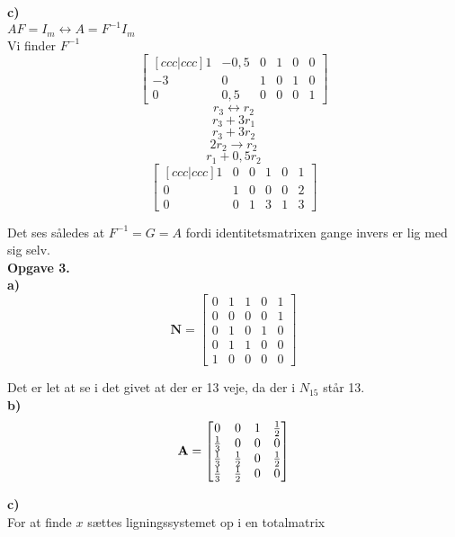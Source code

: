 \documentclass[12pt]{article}
\begin{document}
{\textbf{c)}\\

$AF = I_m \leftrightarrow A = F^{-1} I_m$\\

Vi finder $F^{-1}$\\
$$
\begin{bmatrix}[ccc|ccc]
1  & -0,5 & 0 & 1 & 0 & 0 \\
-3 & 0 & 1 & 0 & 1 & 0 \\
0 & 0,5 & 0 & 0 & 0 & 1
\end{bmatrix}
$$
$$ r_3 \leftrightarrow r_2$$
$$ r_3 + 3r_1$$
$$r_3 + 3r_2$$
$$2r_2 \rightarrow r_2$$
$$r_1 + 0,5r_2$$
$$
\begin{bmatrix}[ccc|ccc]
1  & 0 & 0 & 1 & 0 & 1 \\
0 & 1 & 0 & 0 & 0 & 2\\
0 & 0 & 1 & 3 & 1 & 3 
\end{bmatrix}
$$

Det ses således at $F^{-1} = G = A$ fordi identitetsmatrixen gange  invers er lig med sig selv. \\

\textbf{\large Opgave 3.}\\

\textbf{a)}\\
$$
\textbf{N} = 
\begin{bmatrix}
0 & 1 & 1 & 0 & 1 \\
0 & 0 & 0 & 0 & 1 \\
0 & 1 & 0 & 1 & 0 \\
0 & 1 & 1 & 0 & 0 \\
1 & 0 & 0 & 0 & 0
\end{bmatrix}
$$

Det er let at se i det givet at der er 13 veje, da der i $N_{15}$ står 13.\\

\textbf{b)}\\

$$
\textbf{A} = 
\begin{bmatrix}
0 & 0 & 1 & 1 \over 2 \\
1 \over 3 & 0 & 0 & 0 \\
1 \over 3 & 1 \over 2 & 0 & 1 \over 2 \\
1 \over 3 & 1 \over 2 & 0 & 0 
\end{bmatrix}
$$


\textbf{c)}\\

For at finde $x$  sættes ligningssystemet op i en totalmatrix

}
\end{document}
